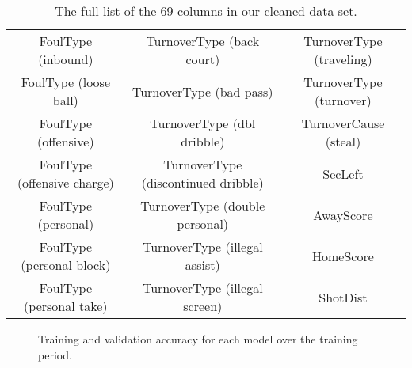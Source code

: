 \begin{table}
\begin{tabular}{ccc}
		FoulType (inbound)          & TurnoverType (back court)           & TurnoverType (traveling)               \\
		FoulType (loose ball)       & TurnoverType (bad pass)             & TurnoverType (turnover)                \\
		FoulType (offensive)        & TurnoverType (dbl dribble)          & TurnoverCause (steal)                  \\
		FoulType (offensive charge) & TurnoverType (discontinued dribble) & SecLeft                                \\
		FoulType (personal)         & TurnoverType (double personal)      & AwayScore                              \\
		FoulType (personal block)   & TurnoverType (illegal assist)       & HomeScore                              \\
		FoulType (personal take)    & TurnoverType (illegal screen)       & ShotDist
	\end{tabular}
	\caption{The full list of the 69 columns in our cleaned data set.}
	\label{tbl:list-of-columns}
\end{table}

\begin{figure}
	\centering
	
	\caption{Training and validation accuracy for each model over the training period.}
	\label{fig:training-curves}
\end{figure}

